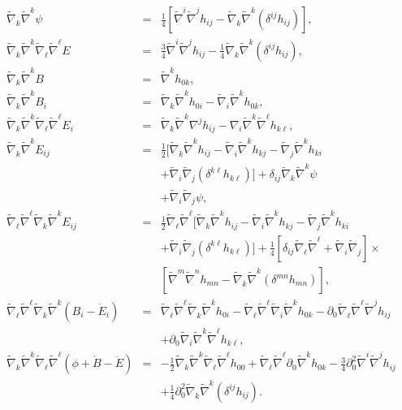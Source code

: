 \begin{eqnarray}
\tilde{\nabla}_k\tilde{\nabla}^k\psi&=&\frac{1}{4} \left[\tilde{\nabla}^i \tilde{\nabla}^jh_{ij}-\tilde{\nabla}_k\tilde{\nabla}^k(\delta^{ij}h_{ij})\right],
\nonumber\\
\tilde{\nabla}_k\tilde{\nabla}^k\tilde{\nabla}_{\ell}\tilde{\nabla}^{\ell}E&=&\frac{3}{4} \tilde{\nabla}^i \tilde{\nabla}^jh_{ij}-\frac{1}{4}\tilde{\nabla}_k\tilde{\nabla}^k(\delta^{ij}h_{ij}),
\nonumber\\
\tilde{\nabla}_k\tilde{\nabla}^kB&=&\tilde{\nabla}^kh_{0k},
\nonumber\\
\tilde{\nabla}_k\tilde{\nabla}^kB_i&=&\tilde{\nabla}_k\tilde{\nabla}^kh_{0i}-\tilde{\nabla}_i\tilde{\nabla}^kh_{0k},
\nonumber\\
\tilde{\nabla}_k\tilde{\nabla}^k\tilde{\nabla}_{\ell}\tilde{\nabla}^{\ell}E_i&=&\tilde{\nabla}_k\tilde{\nabla}^k\nabla^jh_{ij}-\nabla_i\tilde{\nabla}^k\tilde{\nabla}^{\ell}h_{k\ell},
\nonumber\\
\tilde{\nabla}_k\tilde{\nabla}^kE_{ij}&=&\frac{1}{2}\big[\tilde{\nabla}_k\tilde{\nabla}^kh_{ij}-\tilde{\nabla}_i\tilde{\nabla}^kh_{kj}-\tilde{\nabla}_j\tilde{\nabla}^kh_{ki}
\nonumber\\
&&+\tilde{\nabla}_i\tilde{\nabla}_j(\delta^{k\ell}h_{k\ell})\big]+\delta_{ij}\tilde{\nabla}_k\tilde{\nabla}^k\psi
\nonumber\\
&&+\tilde{\nabla}_i\tilde{\nabla}_j\psi,
\nonumber\\
\tilde{\nabla}_{\ell}\tilde{\nabla}^{\ell}\tilde{\nabla}_k\tilde{\nabla}^kE_{ij}&=&
\frac{1}{2} \tilde{\nabla}_{\ell}\tilde{\nabla}^{\ell}\big[\tilde{\nabla}_k\tilde{\nabla}^kh_{ij}-\tilde{\nabla}_i\tilde{\nabla}^kh_{kj}-\tilde{\nabla}_j\tilde{\nabla}^kh_{ki}
\nonumber\\
&&+\tilde{\nabla}_i\tilde{\nabla}_j(\delta^{k\ell}h_{k\ell})\big]+\frac{1}{4}\left[\delta_{ij}\tilde{\nabla}_{\ell}\tilde{\nabla}^{\ell}+\tilde{\nabla}_i\tilde{\nabla}_j \right]\times
\nonumber\\
&&\left[\tilde{\nabla}^m \tilde{\nabla}^nh_{mn}-\tilde{\nabla}_k\tilde{\nabla}^k(\delta^{mn}h_{mn}) \right],
\nonumber\\
\tilde{\nabla}_{\ell}\tilde{\nabla}^{\ell} \tilde{\nabla}_k\tilde{\nabla}^k(B_i-\dot{E}_i)&=&
\tilde{\nabla}_{\ell}\tilde{\nabla}^{\ell}\tilde{\nabla}_k\tilde{\nabla}^kh_{0i}
-\tilde{\nabla}_{\ell}\tilde{\nabla}^{\ell}\tilde{\nabla}_i\tilde{\nabla}^kh_{0k}
-\partial_0\tilde{\nabla}_{\ell}\tilde{\nabla}^{\ell}\tilde{\nabla}^jh_{ij}
\nonumber\\
&&+\partial_0\tilde{\nabla}_{i}\tilde{\nabla}^{k}\tilde{\nabla}^{\ell}h_{k\ell},
\nonumber\\
\tilde{\nabla}_k\tilde{\nabla}^k\tilde{\nabla}_{\ell}\tilde{\nabla}^{\ell}(\phi+\dot{B}-\ddot{E})&=&
-\tfrac{1}{2}\tilde{\nabla}_k\tilde{\nabla}^k\tilde{\nabla}_{\ell}\tilde{\nabla}^{\ell}h_{00}
+\tilde{\nabla}_{\ell}\tilde{\nabla}^{\ell}\partial_0\tilde{\nabla}^kh_{0k}
-\tfrac{3}{4}\partial_0^2\tilde{\nabla}^i\tilde{\nabla}^jh_{ij}
\nonumber\\
&&+\tfrac{1}{4}\partial_0^2\tilde{\nabla}_{k}\tilde{\nabla}^{k}(\delta^{ij}h_{ij}).
\label{2.6}
\end{eqnarray}
